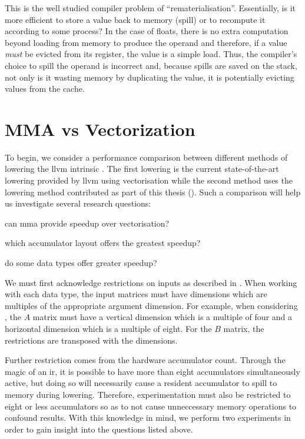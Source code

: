 \documentclass[\main/thesis.tex]{subfiles}
\begin{document}
This is the well studied compiler problem of ``\gls{rematerialisation}''.
Essentially, is it more efficient to store a value back to memory (\gls{spill}) or to recompute it according to some process?
In the case of floats, there is no extra computation beyond loading from memory to produce the operand and therefore, if a value \emph{must} be evicted from its register,  the value is a simple load.
Thus, the compiler's choice to spill the operand is incorrect and, because spills are saved on the stack, not only is it wasting memory by duplicating the value, it is potentially evicting values from the cache.

\section{MMA vs Vectorization}
\label{sec:mmaVsVec}
To begin, we consider a performance comparison between different methods of \gls{lowering} the \gls{llvm} intrinsic .
The first lowering is the current state-of-the-art lowering provided by \gls{llvm} using \gls{vectorisation} while the second method uses the \gls{lowering} method contributed as part of this thesis ().
Such a comparison will help us investigate several research questions:
\begin{enumerate*}[itemjoin*={{ and }}, label=\textbf{(\arabic*)}]
  \item can \gls{mma} provide speedup over \gls{vectorisation}?
  \item which accumulator layout offers the greatest speedup?
  \item do some data types offer greater speedup?
\end{enumerate*}

We must first acknowledge restrictions on inputs as described in .
When working with each data type, the input matrices must have dimensions which are multiples of the appropriate argument dimension.
For example, when considering , the $A$ matrix must have a vertical dimension which is a multiple of four and a horizontal dimension which is a multiple of eight.
For the $B$ matrix, the restrictions are transposed with the dimensions.

Further restriction comes from the hardware accumulator count.
Through the magic of an \gls{ir}, it is possible to have more than eight accumulators simultaneously active, but doing so will necessarily cause a resident accumulator to \gls{spill} to memory during \gls{lowering}.
Therefore, experimentation must also be restricted to eight or less accumulators so as to not cause unneccessary memory operations to confound results.
With this knowledge in mind, we perform two experiments in order to gain insight into the questions listed above.
\end{document}
